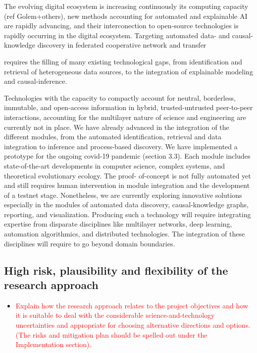 \documentclass[12pt, a4paper]{article} %
\begin{document}
  The evolving digital ecosystem is increasing continuously its
  computing capacity (ref Golem+others), new methods accounting for
  automated and explainable AI are rapidly advancing, and their
  interconection to open-source technologies is rapidly occurring in
  the digital ecosystem. Targeting automated data- and
  causal-knowledge discovery in federated cooperative network and
  transfer


  requires the filling
  of many existing technological gaps, from identification and
  retrieval of heterogeneous data sources, to the integration of
  explainable modeling and causal-inference.

  Technologies with the capacity to compactly account for neutral,
  borderless, immutable, and open-access information in hybrid,
  trusted-untrusted peer-to-peer interactions, accounting for the
  multilayer nature of science and engineering are currently not in
  place. We have already advanced in the integration of the different
  modules, from the automated identification, retrieval and data
  integration to inference and process-based discovery. We have
  implemented a prototype for the ongoing covid-19 pandemic (section
  3.3). Each module includes state-of-the-art developments in computer
  science, complex systems, and theoretical evolutionary ecology. The
  proof- of-concept is not fully automated yet and still requires
  human intervention in module integration and the development of a
  testnet stage. Nonetheless, we are currently exploring innovative
  solutions especially in the modules of automated data discovery,
  causal-knowledge graphs, reporting, and visualization.  Producing
  such a technology will require integrating expertise from disparate
  disciplines like multilayer networks, deep learning, automation
  algorithmics, and distributed technologies. The integration of these
  disciplines will require to go beyond domain boundaries.



\subsection{High risk, plausibility and flexibility of the research approach}


\begin{itemize}
\item \textcolor{red}{Explain how the research approach relates to the
    project objectives and how it is suitable to deal with the
    considerable science-and-technology uncertainties and appropriate
    for choosing alternative directions and options. (The risks and
    mitigation plan should be spelled out under the Implementation
    section).}
\end{itemize}
\end{document}
